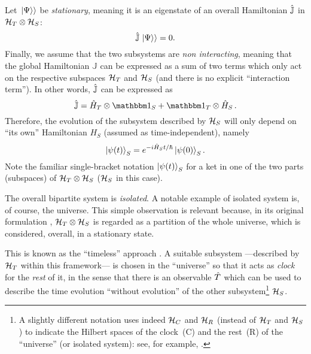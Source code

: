 Let $\left.\left| \Psi \right\rangle\right\rangle$ be \emph{stationary}, meaning it is an eigenstate
of an overall Hamiltonian $\hat{\mathbb{J}}$ in $\mathcal{H}_T \otimes \mathcal{H}_S$:
\begin{equation}\label{eq:Wheeler-DeWitt}  %
  \op{\mathbb{J}} \dket{\Psi} = 0 \text{.}
\end{equation}
Finally, we assume that the two subsystems
are \emph{non interacting},
meaning that the global Hamiltonian $\mathbb{J}$ can be expressed as a sum of two terms
which only act on the respective subspaces $\mathcal{H}_T$ and $\mathcal{H}_S$
(and there is no explicit ``interaction term''). In other words,
$\hat{\mathbb{J}}$ can be expressed as
\begin{equation}\label{eq:pwHamiltonian}
  \op{\mathbb{J}} = \op{H}_T \ox \idop_S + \idop_T \ox \op{H}_S \, \text{.}
\end{equation}
Therefore,
the evolution of the subsystem described by $\mathcal{H}_S$
will only depend on ``its own''
Hamiltonian $H_S$ (assumed as time-independent), namely
\begin{equation}\label{eq:pw:ordinary_S}
  \ket{\psi(t)}_S = e^{- i \hat{H}_S t / \hbar} \ket{\psi(0)}_S \text{.}
\end{equation}
Note the familiar single-bracket notation $\ket{\psi(t)}_S$ for a ket in
one of the two parts (subspaces) of $\mathcal{H}_T \otimes \mathcal{H}_S$ ($\mathcal{H}_S$ in this case).

The overall bipartite system is \emph{isolated}. A notable example of isolated system is, of course, the universe.
This simple observation is relevant because,
in its original formulation \parencite{PageWootters}, $\mathcal{H}_T \otimes \mathcal{H}_S$ is regarded
as a partition of the whole universe, which is considered, overall, in a stationary state.

This is known as the
``timeless'' approach \parencite{Marletto:Evolution}.
\citereset
A suitable subsystem ---described by $\mathcal{H}_T$ within this framework---
is chosen in the ``universe'' so that it acts as
\emph{clock} for the \emph{rest} of it, in the sense that
there is an observable $\hat{T}$
which can be used to
describe the time evolution ``without evolution''
of the other subsystem\footnote{
  A slightly different notation
  uses indeed $\mathcal{H}_C$ and $\mathcal{H}_R$ (instead of $\mathcal{H}_T$ and $\mathcal{H}_S$)
  to indicate the Hilbert spaces of the clock~(C) and the rest~(R) of the ``universe''
  (or isolated system):
  see, for example, \cite{Marletto:Evolution}.
}
$\mathcal{H}_S$.

